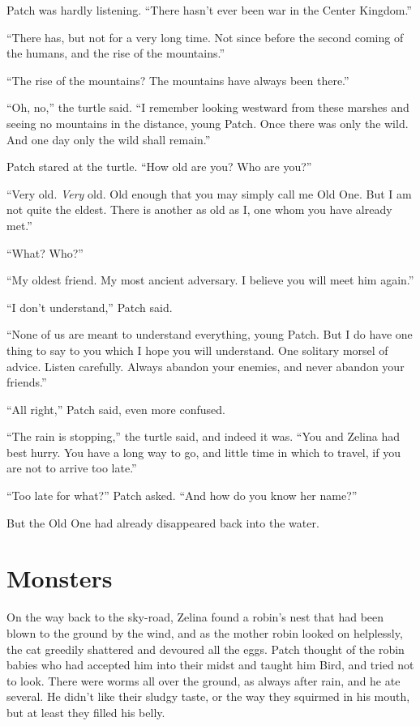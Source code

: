 \documentclass[ebook,oneside,openany,17pt]{memoir}
\renewcommand{\thechapter}{\Roman{chapter}}
\newcounter{sections}
\newcommand{\sections}[1]{%
  \section*{#1}
  \addtocounter{sections}{1}%
  \pdfbookmark[1]{#1}{section.\thechapter.\thesections}}
\begin{document}
Patch was hardly listening. “There hasn’t ever been war in the Center
Kingdom.”

“There has, but not for a very long time. Not since before the second
coming of the humans, and the rise of the mountains.”

“The rise of the mountains? The mountains have always been there.”

“Oh, no,” the turtle said. “I remember looking westward from these
marshes and seeing no mountains in the distance, young Patch. Once
there was only the wild. And one day only the wild shall remain.”

Patch stared at the turtle. “How old are you? Who are you?”

“Very old. \emph{Very} old. Old enough that you may simply call me
Old One. But I am not quite the eldest. There is another as old as I,
one whom you have already met.”

“What? Who?”

“My oldest friend. My most ancient adversary. I believe you will meet
him again.”

“I don’t understand,” Patch said.

“None of us are meant to understand everything, young Patch. But I do
have one thing to say to you which I hope you will understand. One
solitary morsel of advice. Listen carefully. Always abandon your
enemies, and never abandon your friends.”

“All right,” Patch said, even more confused.

“The rain is stopping,” the turtle said, and indeed it was. “You and
Zelina had best hurry. You have a long way to go, and little time in
which to travel, if you are not to arrive too late.”

“Too late for what?” Patch asked. “And how do you know her name?”

But the Old One had already disappeared back into the water.


\sections{Monsters}

On the way back to the sky-road, Zelina found a robin’s nest that had
been blown to the ground by the wind, and as the mother robin looked
on helplessly, the cat greedily shattered and devoured all the
eggs. Patch thought of the robin babies who had accepted him into
their midst and taught him Bird, and tried not to look. There were
worms all over the ground, as always after rain, and he ate
several. He didn’t like their sludgy taste, or the way they squirmed
in his mouth, but at least they filled his belly.
\end{document}
